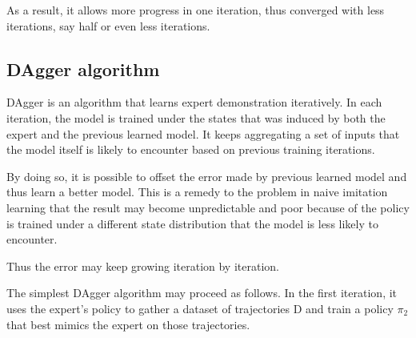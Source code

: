 \documentclass[twoside]{article}
\begin{document}
As a result, it allows more progress in one iteration, thus converged with less iterations, say half or even less iterations.  








\subsection{DAgger algorithm}
DAgger is an algorithm that learns expert demonstration iteratively. In each iteration, the model is trained under the states that was induced by both the expert and the previous learned model. It keeps aggregating a set of inputs that the model itself is likely to encounter based on previous training iterations.  

By doing so, it is possible to offset the error made by previous learned model and thus learn a better model. This is a remedy to the problem in naive imitation learning that the result may become unpredictable and poor because of the policy is trained under a different state distribution
that the model is less likely to encounter. 


Thus the error may keep growing iteration by iteration.

The simplest DAgger algorithm may proceed as follows.
In the first iteration, it uses the expert’s policy to gather
a dataset of trajectories D and train a policy $\pi_2$ that best
mimics the expert on those trajectories. 
\end{document}
